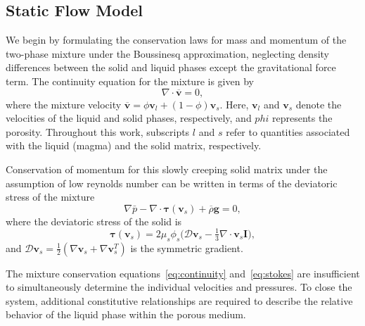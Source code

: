 \subsection{Static Flow Model}
We begin by formulating the conservation laws for mass and momentum of the two-phase mixture under the 
Boussinesq approximation, neglecting density differences between the solid and liquid phases except the
gravitational force term. 
The continuity equation for the mixture is given by
\begin{equation}
		  \label{eq:continuity}
		  \nabla \cdot \overline{\mathbf{v}} = 0,
\end{equation}
where the mixture velocity $\overline{\mathbf{v}} = \phi\mathbf{v}_l + (1-\phi)\mathbf{v}_s$.
Here, $\mathbf{v}_l$ and $\mathbf{v}_s$
denote the velocities of the liquid and solid phases, respectively, and 
$phi$ represents the porosity. Throughout this work, subscripts 
$l$ and $s$ refer to quantities associated with the liquid (magma) and the solid matrix, respectively.

Conservation of momentum for this slowly creeping solid matrix under the assumption of 
low reynolds number can be 
written in terms of the deviatoric stress of the mixture 
\begin{equation}
		  \label{eq:stokes}
		  \nabla\bar p - \nabla \cdot \pmb{\tau}(\mathbf{v}_s) + \overline{\rho}\mathbf{g}= 0,
\end{equation}
where the deviatoric stress of the solid is
\begin{equation}\label{eq:deviatoricstress}
		  \pmb{\tau}(\mathbf{v}_s)
		  = 2\mu_s\phi_s\big(\mathcal{D} \mathbf{v}_s - \tfrac{1}{3}\nabla \cdot \mathbf{v}_s \mathbf{I}\big),
\end{equation}
and $\mathcal{D} \mathbf{v}_s=\frac{1}{2}(\nabla\mathbf{v}_s + \nabla\mathbf{v}_s^T)$ is the symmetric gradient.

The mixture conservation equations~\eqref{eq:continuity} 
and~\eqref{eq:stokes} are insufficient to simultaneously
determine the individual velocities and pressures. To close the system, additional 
constitutive relationships are required to describe the relative behavior of the liquid 
phase within the porous medium.

